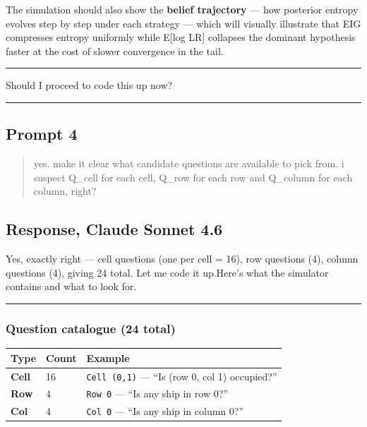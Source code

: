 \documentclass[
]{article}
\begin{document}
The simulation should also show the \textbf{belief trajectory} --- how
posterior entropy evolves step by step under each strategy --- which
will visually illustrate that EIG compresses entropy uniformly while
E{[}log LR{]} collapses the dominant hypothesis faster at the cost of
slower convergence in the tail.

\begin{center}\rule{0.5\linewidth}{0.5pt}\end{center}

Should I proceed to code this up now?

\begin{center}\rule{0.5\linewidth}{0.5pt}\end{center}

\subsection{Prompt 4}\label{prompt-4}

\begin{quote}
yes. make it clear what candidate questions are available to pick from.
i suspect Q\_cell for each cell, Q\_row for each row and Q\_column for
each column, right?
\end{quote}

\subsection{Response, Claude Sonnet
4.6}\label{response-claude-sonnet-4.6-3}

Yes, exactly right --- cell questions (one per cell = 16), row questions
(4), column questions (4), giving 24 total. Let me code it up.Here's
what the simulator contains and what to look for.

\begin{center}\rule{0.5\linewidth}{0.5pt}\end{center}

\subsubsection{Question catalogue (24
total)}\label{question-catalogue-24-total}

\begin{longtable}[]{@{}lll@{}}
\toprule\noalign{}
Type & Count & Example \\
\midrule\noalign{}
\endhead
\bottomrule\noalign{}
\endlastfoot
\textbf{Cell} & 16 & \texttt{Cell\ (0,1)} --- ``Is (row 0, col 1)
occupied?'' \\
\textbf{Row} & 4 & \texttt{Row\ 0} --- ``Is any ship in row 0?'' \\
\textbf{Col} & 4 & \texttt{Col\ 0} --- ``Is any ship in column 0?'' \\
\end{longtable}
\end{document}

